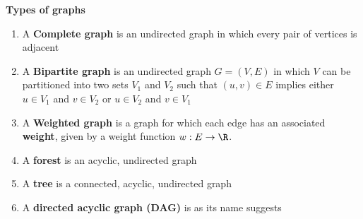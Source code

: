 \documentclass[11pt]{article}
\begin{document}
\begin{defn*}
    \textbf{Types of graphs}
    \begin{enumerate}
        \item A \textbf{Complete graph} is an undirected graph in which every pair of vertices is adjacent 
        \item A \textbf{Bipartite graph} is an undirected graph $G = (V,E)$ in which $V$ can be partitioned into two sets $V_1$ and $V_2$ such that $(u,v)\in E$ implies either $u \in V_1$ and $v\in V_2$ or $u\in V_2$ and $v\in V_1$
        \item A \textbf{Weighted graph} is a graph for which each edge has an associated \textbf{weight}, given by a weight function $w: E\to \R$.
        \item A \textbf{forest} is an acyclic, undirected graph 
        \item A \textbf{tree} is a connected, acyclic, undirected graph 
        \item A \textbf{directed acyclic graph (DAG)} is as its name suggests
    \end{enumerate}
\end{defn*}
\end{document}
